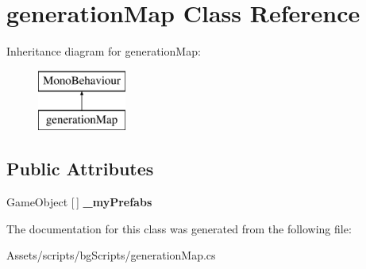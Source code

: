 \hypertarget{classgeneration_map}{}\section{generation\+Map Class Reference}
\label{classgeneration_map}
Inheritance diagram for generation\+Map\+:\begin{figure}[H]
\begin{center}
\leavevmode
\includegraphics[height=2.000000cm]{classgeneration_map}
\end{center}
\end{figure}
\subsection*{Public Attributes}
\begin{DoxyCompactItemize}
\item 
\mbox{\label{classgeneration_map_a3b44626f9ff72afdd6eb7b73bcf8fe34}} 
Game\+Object \mbox{[}$\,$\mbox{]} {\bfseries \+\_\+my\+Prefabs}
\end{DoxyCompactItemize}


The documentation for this class was generated from the following file\+:\begin{DoxyCompactItemize}
\item 
Assets/scripts/bg\+Scripts/generation\+Map.\+cs\end{DoxyCompactItemize}
